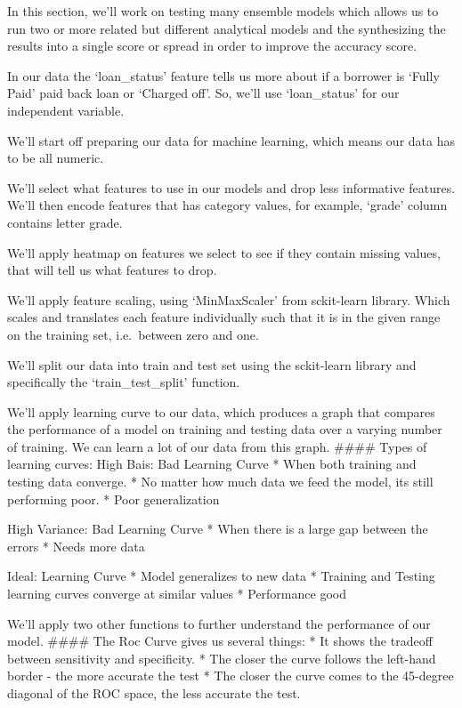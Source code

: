 \documentclass[11pt]{article}
\begin{document}
In this section, we'll work on testing many ensemble models which allows
us to run two or more related but different analytical models and the
synthesizing the results into a single score or spread in order to
improve the accuracy score.

In our data the `loan\_status' feature tells us more about if a borrower
is `Fully Paid' paid back loan or `Charged off'. So, we'll use
`loan\_status' for our independent variable.

We'll start off preparing our data for machine learning, which means our
data has to be all numeric.

We'll select what features to use in our models and drop less
informative features. We'll then encode features that has category
values, for example, `grade' column contains letter grade.

We'll apply heatmap on features we select to see if they contain missing
values, that will tell us what features to drop.

We'll apply feature scaling, using `MinMaxScaler' from sckit-learn
library. Which scales and translates each feature individually such that
it is in the given range on the training set, i.e.~between zero and one.

We'll split our data into train and test set using the sckit-learn
library and specifically the `train\_test\_split' function.

We'll apply learning curve to our data, which produces a graph that
compares the performance of a model on training and testing data over a
varying number of training. We can learn a lot of our data from this
graph. \#\#\#\# Types of learning curves: High Bais: Bad Learning Curve
* When both training and testing data converge. * No matter how much
data we feed the model, its still performing poor. * Poor generalization

High Variance: Bad Learning Curve * When there is a large gap between
the errors * Needs more data

Ideal: Learning Curve * Model generalizes to new data * Training and
Testing learning curves converge at similar values * Performance good

We'll apply two other functions to further understand the performance of
our model. \#\#\#\# The Roc Curve gives us several things: * It shows
the tradeoff between sensitivity and specificity. * The closer the curve
follows the left-hand border - the more accurate the test * The closer
the curve comes to the 45-degree diagonal of the ROC space, the less
accurate the test.
\end{document}
